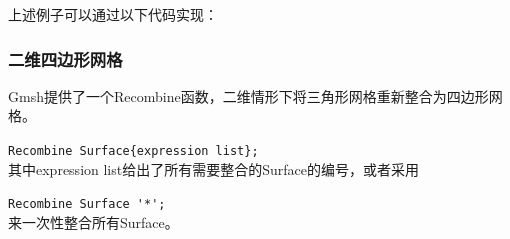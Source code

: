 \documentclass[a4paper,  11pt]{ctexart}
\newcommand\inputccode[1]{}
\begin{document}
\begin{figure}[H]
{		}
\end{figure}
上述例子可以通过以下代码实现：
\inputccode{field.geo}
\subsubsection{二维四边形网格}
Gmsh提供了一个Recombine函数，二维情形下将三角形网格重新整合为四边形网
格。\par
\verb|Recombine Surface{expression list};| \\
其中expression list给出了所有需要整合的Surface的编号，或者采用 \par
\verb|Recombine Surface '*';| \\
来一次性整合所有Surface。

\begin{figure}[H]
	\centering
\end{figure}
\end{document}
